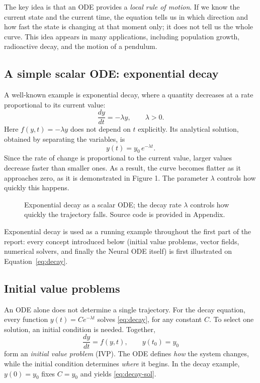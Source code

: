 \documentclass[11pt,a4paper]{article}
\newcommand{\figph}[2]{%
  \fbox{\parbox[c][3.2cm][c]{\dimexpr#1-2\fboxsep-2\fboxrule\relax}{%
    \centering\small\ttfamily [figure: #2]}}}
\begin{document}
The key idea is that an ODE provides a \emph{local rule of motion}. If we know
the current state and the current time, the equation tells us in which direction
and how fast the state is changing at that moment only; it does not tell us the whole
curve. This idea appears in many applications, including population growth,
radioactive decay, and the motion of a pendulum.

\subsection{A simple scalar ODE: exponential decay}

A well-known example is exponential decay, where a quantity decreases at a rate
proportional to its current value:
\begin{equation}
  \frac{dy}{dt} = -\lambda y, \qquad \lambda > 0 .
  \label{eq:decay}
\end{equation}
Here $f(y,t) = -\lambda y$ does not depend on $t$ explicitly. Its analytical
solution, obtained by separating the variables, is
\begin{equation}
  y(t) = y_0\, e^{-\lambda t}.
  \label{eq:decay-sol}
\end{equation}
Since the rate of change is proportional to the current value, larger values
decrease faster than smaller ones. As a result, the curve becomes flatter as it
approaches zero, as it is demonstrated in Figure 1. The parameter $\lambda$ controls how quickly this happens.

\begin{figure}[h]
  \centering
  \figph{0.6\textwidth}{fig1\_exp\_decay}
  \caption{Exponential decay as a scalar ODE; the decay rate $\lambda$ controls
  how quickly the trajectory falls. Source code is provided in Appendix.}
  \label{fig:decay}
\end{figure}

Exponential decay is used as a running example throughout the first part of the
report: every concept introduced below (initial value problems, vector fields,
numerical solvers, and finally the Neural ODE itself) is first illustrated on
Equation~\eqref{eq:decay}.

\subsection{Initial value problems}

An ODE alone does not determine a single trajectory. For the decay equation, every
function $y(t) = C e^{-\lambda t}$ solves \eqref{eq:decay}, for any constant $C$.
To select one solution, an initial condition is needed. Together,
\begin{equation}
  \frac{dy}{dt} = f(y,t), \qquad y(t_0) = y_0
  \label{eq:ivp}
\end{equation}
form an \emph{initial value problem} (IVP). The ODE defines \emph{how} the system
changes, while the initial condition determines \emph{where} it begins. In the
decay example, $y(0) = y_0$ fixes $C = y_0$ and yields \eqref{eq:decay-sol}.
\end{document}
